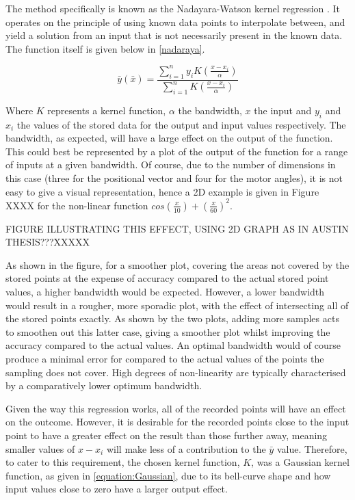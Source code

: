 \documentclass[11pt]{article}
\begin{document}
The method specifically is known as the Nadayara-Watson kernel regression \cite{nadaraya1964}. It operates on the principle of using known data points to interpolate between, and yield a solution from an input that is not necessarily present in the known data. The function itself is given below in \eqref{nadaraya}.

\begin{equation}\label{nadaraya}
\bar{y}(\bar{x}) = \frac{\sum_{i=1}^{n}y_{i}K(\frac{x - x_{i}}{\alpha})}{\sum_{i=1}^{n}K(\frac{x - x_{i}}{\alpha})}
\end{equation}

Where $K$ represents a kernel function, $\alpha$ the bandwidth, $x$ the input and $y_{i}$ and $x_{i}$ the values of the stored data for the output and input values respectively. The bandwidth, as expected, will have a large effect on the output of the function. This could best be represented by a plot of the output of the function for a range of inputs at a given bandwidth. Of course, due to the number of dimensions in this case (three for the positional vector and four for the motor angles), it is not easy to give a visual representation, hence a 2D example is given in Figure XXXX for the non-linear  function $cos(\frac{x}{10}) + (\frac{x}{60})^2$. 

FIGURE ILLUSTRATING THIS EFFECT, USING 2D GRAPH AS IN AUSTIN THESIS???XXXXX

As shown in the figure, for a smoother plot, covering the areas not covered by the stored points at the expense of accuracy compared to the actual stored point values, a higher bandwidth would be expected. However, a lower bandwidth would result in a rougher, more sporadic plot, with the effect of intersecting all of the stored points exactly. As shown by the two plots, adding more samples acts to smoothen out this latter case, giving a smoother plot whilst improving the accuracy compared to the actual values. An optimal bandwidth would of course produce a minimal error for compared to the actual values of the points the sampling does not cover. High degrees of non-linearity are typically characterised by a comparatively lower optimum bandwidth.

Given the way this regression works, all of the recorded points will have an effect on the outcome. However, it is desirable for the recorded points close to the input point to have a greater effect on the result than those further away, meaning smaller values of $x - x_{i}$ will make less of a contribution to the $\bar{y}$ value. Therefore, to cater to this requirement, the chosen kernel function, $K$, was a Gaussian kernel function, as given in \eqref{equation:Gaussian}, due to its bell-curve shape and how input values close to zero have a larger output effect.
\end{document}
